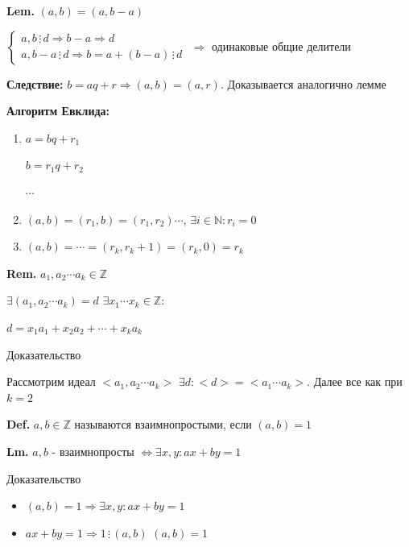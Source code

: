 \documentclass[14pt, letter paper]{article}
\begin{document}
\textbf{Lem.} $(a, b) = (a, b - a)$

$\begin{cases}
    a, b \, \vdots \, d \Rightarrow b - a \Rightarrow d \\
    a, b-a \, \vdots \, d \Rightarrow b = a + (b - a) \, \vdots \, d
\end{cases}$
$\Rightarrow$ одинаковые общие делители

\textbf{Следствие:} $b = aq + r \Rightarrow (a, b) = (a, r)$. Доказывается аналогично лемме

\textbf{Алгоритм Евклида:}
\begin{enumerate}
    \item $a = bq + r_1$ 
    
    $b = r_1 q + r_2$

    $\cdots$
    
    \item $(a, b) = (r_1, b) = (r_1, r_2) \cdots$, $\exists i \in \mathbb{N}: r_i = 0$
    \item $(a, b) = \cdots = (r_k, r_k+1) = (r_k, 0) = r_k$
\end{enumerate}

\textbf{Rem.} $a_1, a_2 \cdots a_k \in \mathbb{Z}$

$\exists (a_1, a_2 \cdots a_k) = d$ $\exists x_1 \cdots x_k \in \mathbb{Z}:$

$d = x_1 a_1 + x_2 a_2 + \cdots + x_k a_k$

\begin{center}
    Доказательство
\end{center}

Рассмотрим идеал $<a_1, a_2 \cdots a_k>$ $\exists d: <d> = <a_1 \cdots a_k>$. Далее все как при $k = 2$

\textbf{Def.} $a, b \in \mathbb{Z}$ называются взаимнопростыми, если $(a, b) = 1$

\textbf{Lm.} $a, b$ - взаимнопросты $\Leftrightarrow \exists x, y : ax + by = 1$

\begin{center}
    Доказательство
\end{center}

\begin{itemize}
    \item[$\Rightarrow$] $(a, b) = 1 \Rightarrow \exists x, y : ax + by = 1$
    \item[$\Leftarrow$] $ax + by = 1 \Rightarrow 1 \, \vdots \, (a, b)$ $(a, b) = 1$
\end{itemize}
\end{document}
